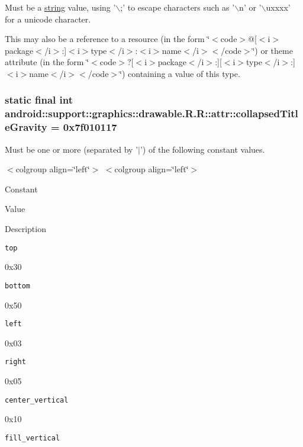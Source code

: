 Must be a \hyperlink{classandroid_1_1support_1_1graphics_1_1drawable_1_1_r_1_1string}{string} value, using '$\backslash$;' to escape characters such as '$\backslash$n' or '$\backslash$uxxxx' for a unicode character. 

This may also be a reference to a resource (in the form \char`\"{}$<$code$>$@\mbox{[}$<$i$>$package$<$/i$>$:\mbox{]}$<$i$>$type$<$/i$>$:$<$i$>$name$<$/i$>$$<$/code$>$\char`\"{}) or theme attribute (in the form \char`\"{}$<$code$>$?\mbox{[}$<$i$>$package$<$/i$>$:\mbox{]}\mbox{[}$<$i$>$type$<$/i$>$:\mbox{]}$<$i$>$name$<$/i$>$$<$/code$>$\char`\"{}) containing a value of this type. \hypertarget{classandroid_1_1support_1_1graphics_1_1drawable_1_1_r_1_1attr_ac39a7943c3a576e78ce4f2e903e8a86}{
\subsubsection[{collapsedTitleGravity}]{\setlength{\rightskip}{0pt plus 5cm}static final int android::support::graphics::drawable.R.R::attr::collapsedTitleGravity = 0x7f010117}}
\label{classandroid_1_1support_1_1graphics_1_1drawable_1_1_r_1_1attr_ac39a7943c3a576e78ce4f2e903e8a86}


Must be one or more (separated by '$|$') of the following constant values. \begin{TabularC}{0}
\hline
\end{TabularC}
$<$colgroup align=\char`\"{}left\char`\"{}$>$ $<$colgroup align=\char`\"{}left\char`\"{}$>$ 

Constant

Value

Description 

{\tt top}

0x30

{\tt bottom}

0x50

{\tt left}

0x03

{\tt right}

0x05

{\tt center\_\-vertical}

0x10

{\tt fill\_\-vertical}

